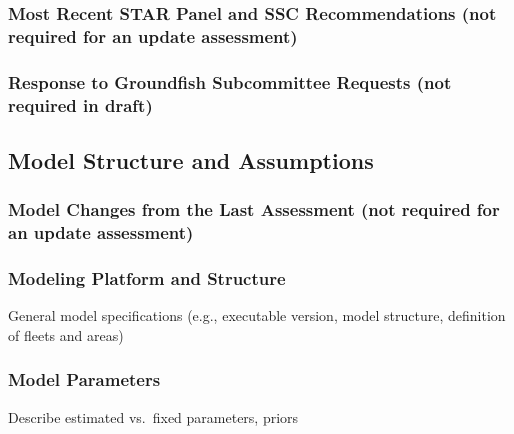 \documentclass[11pt,
  letterpaper,
]{article}
\begin{document}
\hypertarget{most-recent-star-panel-and-ssc-recommendations-not-required-for-an-update-assessment}{%
\subsubsection{Most Recent STAR Panel and SSC Recommendations (not required for an update assessment)}\label{most-recent-star-panel-and-ssc-recommendations-not-required-for-an-update-assessment}}

\hypertarget{response-to-groundfish-subcommittee-requests-not-required-in-draft}{%
\subsubsection{Response to Groundfish Subcommittee Requests (not required in draft)}\label{response-to-groundfish-subcommittee-requests-not-required-in-draft}}

\hypertarget{model-structure-and-assumptions}{%
\subsection{Model Structure and Assumptions}\label{model-structure-and-assumptions}}

\hypertarget{model-changes-from-the-last-assessment-not-required-for-an-update-assessment}{%
\subsubsection{Model Changes from the Last Assessment (not required for an update assessment)}\label{model-changes-from-the-last-assessment-not-required-for-an-update-assessment}}

\hypertarget{modeling-platform-and-structure}{%
\subsubsection{Modeling Platform and Structure}\label{modeling-platform-and-structure}}

General model specifications (e.g., executable version, model structure, definition of fleets and areas)

\hypertarget{model-parameters}{%
\subsubsection{Model Parameters}\label{model-parameters}}

Describe estimated vs.~fixed parameters, priors
\end{document}
